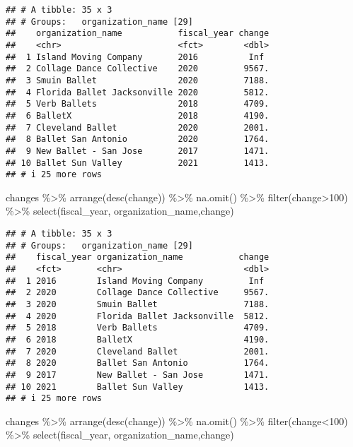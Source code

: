 \documentclass[
]{article}
\newenvironment{Shaded}{\begin{snugshade}}{\end{snugshade}}
\newcommand{\DecValTok}[1]{\textcolor[rgb]{0.00,0.00,0.81}{#1}}
\newcommand{\FunctionTok}[1]{\textcolor[rgb]{0.00,0.00,0.00}{#1}}
\newcommand{\NormalTok}[1]{#1}
\newcommand{\SpecialCharTok}[1]{\textcolor[rgb]{0.00,0.00,0.00}{#1}}
\begin{document}
\begin{verbatim}
## # A tibble: 35 x 3
## # Groups:   organization_name [29]
##    organization_name           fiscal_year change
##    <chr>                       <fct>        <dbl>
##  1 Island Moving Company       2016          Inf 
##  2 Collage Dance Collective    2020         9567.
##  3 Smuin Ballet                2020         7188.
##  4 Florida Ballet Jacksonville 2020         5812.
##  5 Verb Ballets                2018         4709.
##  6 BalletX                     2018         4190.
##  7 Cleveland Ballet            2020         2001.
##  8 Ballet San Antonio          2020         1764.
##  9 New Ballet - San Jose       2017         1471.
## 10 Ballet Sun Valley           2021         1413.
## # i 25 more rows
\end{verbatim}

\begin{Shaded}
\begin{Highlighting}[]
\NormalTok{changes }\SpecialCharTok{\%\textgreater{}\%} 
  \FunctionTok{arrange}\NormalTok{(}\FunctionTok{desc}\NormalTok{(change)) }\SpecialCharTok{\%\textgreater{}\%} 
  \FunctionTok{na.omit}\NormalTok{() }\SpecialCharTok{\%\textgreater{}\%} 
  \FunctionTok{filter}\NormalTok{(change}\SpecialCharTok{\textgreater{}}\DecValTok{100}\NormalTok{) }\SpecialCharTok{\%\textgreater{}\%} 
  \FunctionTok{select}\NormalTok{(fiscal\_year, organization\_name,change)}
\end{Highlighting}
\end{Shaded}

\begin{verbatim}
## # A tibble: 35 x 3
## # Groups:   organization_name [29]
##    fiscal_year organization_name           change
##    <fct>       <chr>                        <dbl>
##  1 2016        Island Moving Company         Inf 
##  2 2020        Collage Dance Collective     9567.
##  3 2020        Smuin Ballet                 7188.
##  4 2020        Florida Ballet Jacksonville  5812.
##  5 2018        Verb Ballets                 4709.
##  6 2018        BalletX                      4190.
##  7 2020        Cleveland Ballet             2001.
##  8 2020        Ballet San Antonio           1764.
##  9 2017        New Ballet - San Jose        1471.
## 10 2021        Ballet Sun Valley            1413.
## # i 25 more rows
\end{verbatim}

\begin{Shaded}
\begin{Highlighting}[]
\NormalTok{changes }\SpecialCharTok{\%\textgreater{}\%} 
  \FunctionTok{arrange}\NormalTok{(}\FunctionTok{desc}\NormalTok{(change)) }\SpecialCharTok{\%\textgreater{}\%} 
  \FunctionTok{na.omit}\NormalTok{() }\SpecialCharTok{\%\textgreater{}\%} 
  \FunctionTok{filter}\NormalTok{(change}\SpecialCharTok{\textless{}}\DecValTok{100}\NormalTok{) }\SpecialCharTok{\%\textgreater{}\%} 
  \FunctionTok{select}\NormalTok{(fiscal\_year, organization\_name,change)}
\end{Highlighting}
\end{Shaded}
\end{document}
